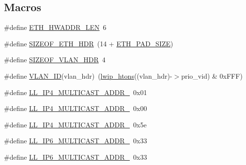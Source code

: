 \subsection*{Macros}
\begin{DoxyCompactItemize}
\item 
\#define \hyperlink{openmote-cc2538_2lwip_2src_2include_2lwip_2prot_2ethernet_8h_ac9426049770b40fcd9556ffbd7e56907}{E\+T\+H\+\_\+\+H\+W\+A\+D\+D\+R\+\_\+\+L\+EN}~6
\item 
\#define \hyperlink{openmote-cc2538_2lwip_2src_2include_2lwip_2prot_2ethernet_8h_a85d254d78726c038270fe87905845e75}{S\+I\+Z\+E\+O\+F\+\_\+\+E\+T\+H\+\_\+\+H\+DR}~(14 + \hyperlink{group__lwip__opts__arp_gad7fa3b356ca7e603e848b069c4cc6276}{E\+T\+H\+\_\+\+P\+A\+D\+\_\+\+S\+I\+ZE})
\item 
\#define \hyperlink{openmote-cc2538_2lwip_2src_2include_2lwip_2prot_2ethernet_8h_a2443b91084b01e4f22423d74d3ae19fe}{S\+I\+Z\+E\+O\+F\+\_\+\+V\+L\+A\+N\+\_\+\+H\+DR}~4
\item 
\#define \hyperlink{openmote-cc2538_2lwip_2src_2include_2lwip_2prot_2ethernet_8h_aa36e5e552e17cea1828f0a6792eb29d4}{V\+L\+A\+N\+\_\+\+ID}(vlan\+\_\+hdr)~(\hyperlink{openmote-cc2538_2lwip_2src_2core_2def_8c_ad637280639de4066392e6b5614fa3e56}{lwip\+\_\+htons}((vlan\+\_\+hdr)-\/$>$prio\+\_\+vid) \& 0x\+F\+F\+F)
\item 
\#define \hyperlink{openmote-cc2538_2lwip_2src_2include_2lwip_2prot_2ethernet_8h_afaf6cbccf9477c3505660e3a17860e07}{L\+L\+\_\+\+I\+P4\+\_\+\+M\+U\+L\+T\+I\+C\+A\+S\+T\+\_\+\+A\+D\+D\+R\+\_}~0x01
\item 
\#define \hyperlink{openmote-cc2538_2lwip_2src_2include_2lwip_2prot_2ethernet_8h_ac08b2a99f6ff9cbafaa1cb5a6405d225}{L\+L\+\_\+\+I\+P4\+\_\+\+M\+U\+L\+T\+I\+C\+A\+S\+T\+\_\+\+A\+D\+D\+R\+\_}~0x00
\item 
\#define \hyperlink{openmote-cc2538_2lwip_2src_2include_2lwip_2prot_2ethernet_8h_a98285b6f76c2eb6b6c738da62176bce0}{L\+L\+\_\+\+I\+P4\+\_\+\+M\+U\+L\+T\+I\+C\+A\+S\+T\+\_\+\+A\+D\+D\+R\+\_}~0x5e
\item 
\#define \hyperlink{openmote-cc2538_2lwip_2src_2include_2lwip_2prot_2ethernet_8h_a8ebe93c6ad2d743e6c952539257679b6}{L\+L\+\_\+\+I\+P6\+\_\+\+M\+U\+L\+T\+I\+C\+A\+S\+T\+\_\+\+A\+D\+D\+R\+\_}~0x33
\item 
\#define \hyperlink{openmote-cc2538_2lwip_2src_2include_2lwip_2prot_2ethernet_8h_acf77751aed309653aaa33032732dd243}{L\+L\+\_\+\+I\+P6\+\_\+\+M\+U\+L\+T\+I\+C\+A\+S\+T\+\_\+\+A\+D\+D\+R\+\_}~0x33
\item 

\end{DoxyCompactItemize}
